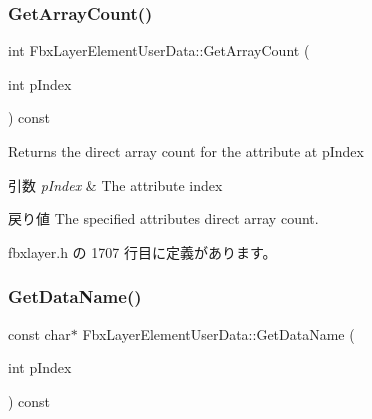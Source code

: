 \mbox{\label{class_fbx_layer_element_user_data_a6b36419283440b8f63c5af36ffb27d3a}} 
\subsubsection{\texorpdfstring{Get\+Array\+Count()}{GetArrayCount()}}
{\footnotesize\ttfamily int Fbx\+Layer\+Element\+User\+Data\+::\+Get\+Array\+Count (\begin{DoxyParamCaption}\item[{int}]{p\+Index }\end{DoxyParamCaption}) const\hspace{0.3cm}{\ttfamily [inline]}}

Returns the direct array count for the attribute at p\+Index 
\begin{DoxyParams}{引数}
{\em p\+Index} & The attribute index \\
\hline
\end{DoxyParams}
\begin{DoxyReturn}{戻り値}
The specified attribute\textquotesingle{}s direct array count. 
\end{DoxyReturn}


 fbxlayer.\+h の 1707 行目に定義があります。

\mbox{\label{class_fbx_layer_element_user_data_aba84f0175d90bd9e5b775391299e44fc}} 
\subsubsection{\texorpdfstring{Get\+Data\+Name()}{GetDataName()}}
{\footnotesize\ttfamily const char$\ast$ Fbx\+Layer\+Element\+User\+Data\+::\+Get\+Data\+Name (\begin{DoxyParamCaption}\item[{int}]{p\+Index }\end{DoxyParamCaption}) const\hspace{0.3cm}{\ttfamily [inline]}}

